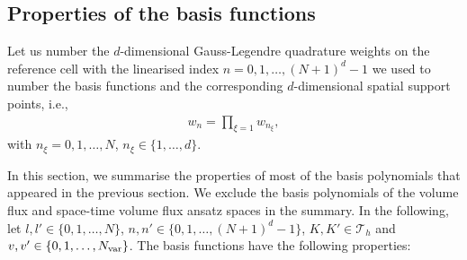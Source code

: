 \documentclass{scrreprt}
\theoremstyle{definition}
\theoremstyle{nonumberplain}
\newcommand{\tria}{\mathcal{T}_h}
\newcommand{\cell}{K}
\begin{document}
\subsection{Properties of the basis functions}
Let us number the $d$-dimensional Gauss-Legendre quadrature weights on the
reference cell with the linearised index
$n=0,1,\ldots,(N+1)^{d}-1$ we used to number the basis functions
and the corresponding $d$-dimensional spatial support points, i.e.,
\begin{align}
w_n = \prod_{\xi=1}w_{n_\xi},
\end{align}
with $n_\xi=0,1,\ldots,N$, $n_\xi\in\{1,\ldots,d\}$.

In this section, we summarise the properties of most of the
basis polynomials that appeared in the previous section.
We exclude the basis polynomials of the volume flux
and space-time volume flux ansatz spaces in the summary.
In the following, let $l,l'\in\{0,1,\ldots,N\}$,
$n,n'\in\{0,1,\ldots,(N+1)^d-1\}$,
$\cell,\cell'\in\tria$ and $v,v'\in\{0,1,\ldots,N_\textup{var}\}$.
The basis functions have the following properties:
\end{document}
